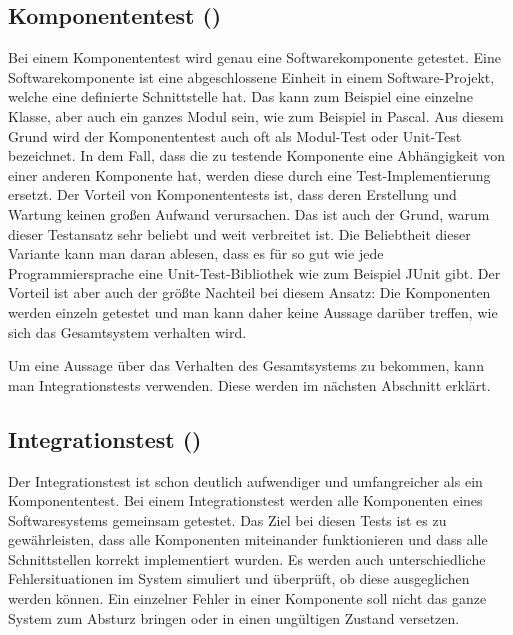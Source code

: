 \subsection{Komponententest ()}

Bei einem Komponententest \cite{xUnit} wird genau eine Softwarekomponente getestet. Eine Softwarekomponente ist eine abgeschlossene Einheit in einem Software-Projekt, welche eine definierte Schnittstelle hat. Das kann zum Beispiel eine einzelne Klasse, aber auch ein ganzes Modul sein, wie zum Beispiel in Pascal. Aus diesem Grund wird der Komponententest auch oft als Modul-Test oder Unit-Test bezeichnet. In dem Fall, dass die zu testende Komponente eine Abhängigkeit von einer anderen Komponente hat, werden diese durch eine Test-Implementierung ersetzt. Der Vorteil von Komponententests ist, dass deren Erstellung und Wartung keinen großen Aufwand verursachen. Das ist auch der Grund, warum dieser Testansatz sehr beliebt und weit verbreitet ist. Die Beliebtheit dieser Variante kann man daran ablesen, dass es für so gut wie jede Programmiersprache eine Unit-Test-Bibliothek wie zum Beispiel JUnit \cite{JUnit} gibt. Der Vorteil ist aber auch der größte Nachteil bei diesem Ansatz: Die Komponenten werden einzeln getestet und man kann daher keine Aussage darüber treffen, wie sich das Gesamtsystem verhalten wird.

\SuperPar
Um eine Aussage über das Verhalten des Gesamtsystems zu bekommen, kann man Integrationstests verwenden. Diese werden im nächsten Abschnitt erklärt.

\subsection{Integrationstest ()}

Der Integrationstest ist schon deutlich aufwendiger und umfangreicher als ein Komponententest. Bei einem Integrationstest werden alle Komponenten eines Softwaresystems gemeinsam getestet. Das Ziel bei diesen Tests ist es zu gewährleisten, dass alle Komponenten miteinander funktionieren und dass alle Schnittstellen korrekt implementiert wurden. Es werden auch unterschiedliche Fehlersituationen im System simuliert und überprüft, ob diese ausgeglichen werden können. Ein einzelner Fehler in einer Komponente soll nicht das ganze System zum Absturz bringen oder in einen ungültigen Zustand versetzen.

